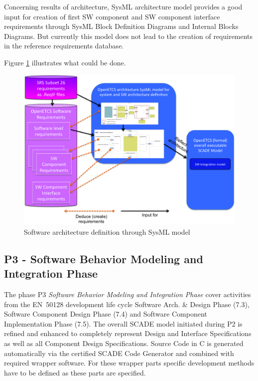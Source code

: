 \documentclass[11pt]{template/openetcs_report}
\begin{document}
Concerning results of architecture, SysML architecture model provides a good input for creation of first SW component and SW component interface requirements through SysML Block Definition Diagrams and Internal Blocks Diagrams. But currently this model does not lead to the creation of requirements in the reference requirements database. 

Figure \ref{fig:P2SoftwareArchitectureWithSysMLModel} illustrates what could be done.

\begin{figure}[htbp]
\centering
\includegraphics[width=.9\linewidth]
{./images/P2SoftwareArchitectureWithSysMLModel.png}
\caption{\label{fig:P2SoftwareArchitectureWithSysMLModel}Software architecture definition through SysML model}
\end{figure}



\subsection{P3 - Software Behavior Modeling and Integration Phase}

The phase P3 \textit{Software Behavior Modeling and Integration Phase} cover activities from the EN~50128 development life cycle Software Arch. \& Design Phase (7.3), Software Component Design Phase (7.4) and Software Component Implementation Phase (7.5). 
The overall SCADE model initiated during P2 is refined and enhanced to completely represent Design and Interface Specifications as well as all Component Design Specifications. Source Code in C is generated automatically via the certified SCADE Code Generator and combined with required wrapper software. For these wrapper parts specific development methods have to be defined as these parts are specified.
\end{document}
